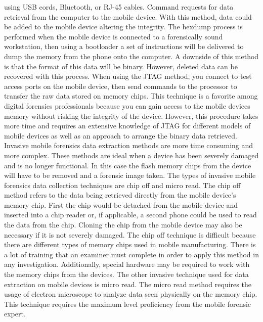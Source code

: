 \documentclass[acmlarge]{acmart}
\begin{document}
using USB cords, Bluetooth, or RJ-45 cables.  Command requests for data retrieval from the computer to the mobile device.  With this method, data could be added to the mobile device altering the integrity.  The hexdump process is performed when the mobile device is connected to a forensically sound workstation, then using a bootloader a set of instructions will be delivered to dump the memory from the phone onto the computer.  A downside of this method is that the format of this data will be binary.  However, deleted data can be recovered with this process.  When using the JTAG method, you connect to test access ports on the mobile device, then send commands to the processor to transfer the raw data stored on memory chips.  This technique is a favorite among digital forensics professionals because you can gain access to the mobile devices memory without risking the integrity of the device.  However, this procedure takes more time and requires an extensive knowledge of JTAG for different models of mobile devices as well as an approach to arrange the binary data retrieved.  Invasive mobile forensics data extraction methods are more time consuming and more complex.  These methods are ideal when a device has been severely damaged and is no longer functional.  In this case the flash memory chips from the device will have to be removed and a forensic image taken.  The types of invasive mobile forensics data collection techniques are chip off and micro read.  The chip off method refers to the data being retrieved directly from the mobile device’s memory chip.  First the chip would be detached from the mobile device and inserted into a chip reader or, if applicable, a second phone could be used to read the data from the chip.  Cloning the chip from the mobile device may also be necessary if it is not severely damaged. The chip off technique is difficult because there are different types of memory chips used in mobile manufacturing.  There is a lot of training that an examiner must complete in order to apply this method in any investigation.  Additionally, special hardware may be required to work with the memory chips from the devices.  The other invasive technique used for data extraction on mobile devices is micro read.  The micro read method requires the usage of electron microscope to analyze data seen physically on the memory chip.  This technique requires the maximum level proficiency from the mobile forensic expert.  
\end{document}
